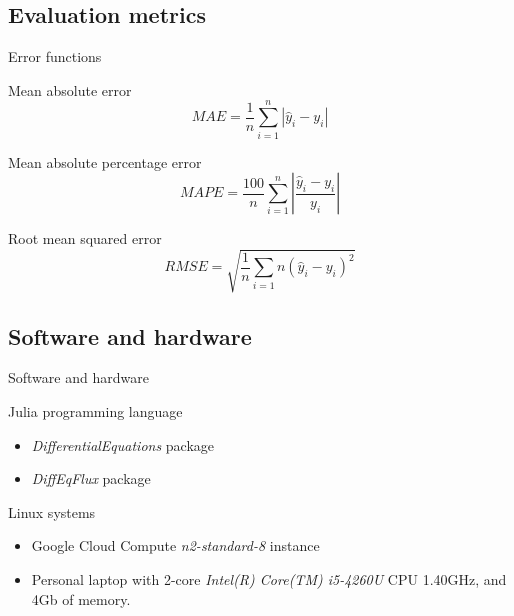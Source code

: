 \subsection{Evaluation metrics}

\begin{frame}{Error functions}

    \begin{block}{Mean absolute error}
        \begin{equation*}
            MAE = \frac{1}{n} \sum_{i=1}^n \left| \hat{y}_i - y_i \right|
        \end{equation*}
    \end{block}

    \begin{block}{Mean absolute percentage error}
        \begin{equation*}
            MAPE = \frac{100}{n} \sum_{i=1}^n \left| \frac{\hat{y}_i - y_i}{y_i} \right|
        \end{equation*}
    \end{block}

    \begin{block}{Root mean squared error}
        \begin{equation*}
            RMSE = \sqrt{\frac{1}{n} \sum_{i=1}{n} (\hat{y}_i - y_i)^2}
        \end{equation*}
    \end{block}

\end{frame}

\subsection{Software and hardware}

\begin{frame}{Software and hardware}

    Julia programming language
    \begin{itemize}
        \item \textit{DifferentialEquations} package
        \item \textit{DiffEqFlux} package
    \end{itemize}

    Linux systems
    \begin{itemize}
        \item Google Cloud Compute \textit{n2-standard-8} instance
        \item Personal laptop with 2-core \textit{Intel(R) Core(TM) i5-4260U} CPU 1.40GHz, and 4Gb of memory.
    \end{itemize}
\end{frame}

